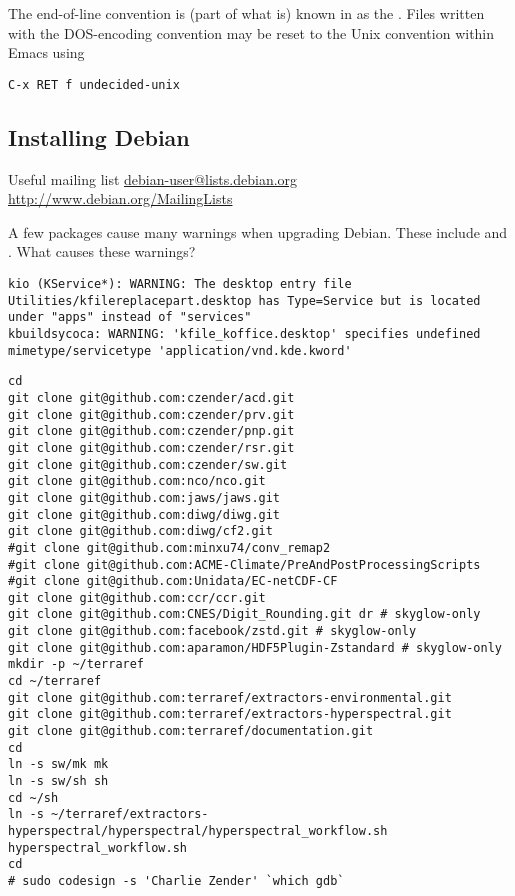 \documentclass[12pt,twoside]{article}
\begin{document}
The end-of-line convention is (part of what is) known in
 as the .
Files written with the DOS-encoding convention may be reset to the
Unix convention within Emacs using
\begin{verbatim}
C-x RET f undecided-unix
\end{verbatim}

\subsection{Installing Debian}\label{sxn:dbn_nst}
Useful mailing list \url{debian-user@lists.debian.org}
\url{http://www.debian.org/MailingLists}

A few packages cause many warnings when upgrading Debian. 
These include  and .
What causes these warnings?
\begin{verbatim}
kio (KService*): WARNING: The desktop entry file Utilities/kfilereplacepart.desktop has Type=Service but is located under "apps" instead of "services"
kbuildsycoca: WARNING: 'kfile_koffice.desktop' specifies undefined mimetype/servicetype 'application/vnd.kde.kword'
\end{verbatim}

\begin{verbatim}
cd
git clone git@github.com:czender/acd.git
git clone git@github.com:czender/prv.git
git clone git@github.com:czender/pnp.git
git clone git@github.com:czender/rsr.git
git clone git@github.com:czender/sw.git
git clone git@github.com:nco/nco.git
git clone git@github.com:jaws/jaws.git
git clone git@github.com:diwg/diwg.git
git clone git@github.com:diwg/cf2.git
#git clone git@github.com:minxu74/conv_remap2
#git clone git@github.com:ACME-Climate/PreAndPostProcessingScripts
#git clone git@github.com:Unidata/EC-netCDF-CF
git clone git@github.com:ccr/ccr.git
git clone git@github.com:CNES/Digit_Rounding.git dr # skyglow-only
git clone git@github.com:facebook/zstd.git # skyglow-only
git clone git@github.com:aparamon/HDF5Plugin-Zstandard # skyglow-only
mkdir -p ~/terraref
cd ~/terraref
git clone git@github.com:terraref/extractors-environmental.git
git clone git@github.com:terraref/extractors-hyperspectral.git
git clone git@github.com:terraref/documentation.git
cd
ln -s sw/mk mk
ln -s sw/sh sh
cd ~/sh
ln -s ~/terraref/extractors-hyperspectral/hyperspectral/hyperspectral_workflow.sh hyperspectral_workflow.sh
cd
# sudo codesign -s 'Charlie Zender' `which gdb`
\end{verbatim}
\end{document}

